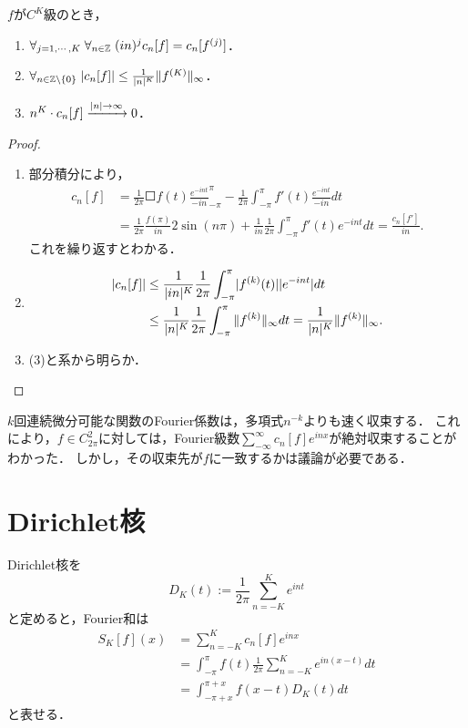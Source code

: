 \documentclass[uplatex,dvipdfmx]{jsreport}
\begin{document}
\begin{corollary}[減衰の精緻化]
    $f$が$C^K$級のとき，
    \begin{enumerate}
        \item $\forall_{j=1,\cdots,K}\;\forall_{n\in\mathbb{Z}}\;(in)^jc_n[f]=c_n[f^{(j)}]$．
        \item $\forall_{n\in\mathbb{Z}\setminus\{0\}}\;\lvert c_n[f]\rvert\le\frac{1}{\lvert n\rvert^K}\|f^{(K)}\|_\infty$．
        \item $n^K\cdot c_n[f]\xrightarrow{\lvert n\rvert\to\infty}0$．
    \end{enumerate}
\end{corollary}
\begin{proof}\mbox{}
    \begin{enumerate}
        \item 部分積分により，
        \begin{align*}
            c_n[f]&=\frac{1}{2\pi}\Square{f(t)\frac{e^{-int}}{-in}}^\pi_{-\pi}-\frac{1}{2\pi}\int^\pi_{-\pi}f'(t)\frac{e^{-int}}{-in}dt\\
            &=\frac{1}{2\pi}\frac{f(\pi)}{in}2\sin(n\pi)+\frac{1}{in}\frac{1}{2\pi}\int^\pi_{-\pi}f'(t)e^{-int}dt=\frac{c_n[f']}{in}.
        \end{align*}
        これを繰り返すとわかる．
        \item \begin{align*}
            \lvert c_n[f]\rvert&\le\frac{1}{\lvert in\rvert^K}\frac{1}{2\pi}\int^\pi_{-\pi}\lvert f^{(k)}(t)\rvert\lvert e^{-int}\rvert dt\\
            &\le\frac{1}{\lvert n\rvert^K}\frac{1}{2\pi}\int^\pi_{-\pi}\|f^{(k)}\|_\infty dt=\frac{1}{\lvert n\rvert^K}\|f^{(k)}\|_\infty.
        \end{align*}
        \item (3)と系から明らか．
    \end{enumerate}
\end{proof}
\begin{remarks}
    $k$回連続微分可能な関数のFourier係数は，多項式$n^{-k}$よりも速く収束する．
    これにより，$f\in C^2_{2\pi}$に対しては，Fourier級数$\sum^\infty_{-\infty}c_n[f]e^{inx}$が絶対収束することがわかった．
    しかし，その収束先が$f$に一致するかは議論が必要である．
\end{remarks}

\section{Dirichlet核}

\begin{definition}
    Dirichlet核を
    \[D_K(t):=\frac{1}{2\pi}\sum^K_{n=-K}e^{int}\]
    と定めると，Fourier和は
    \begin{align*}
        S_K[f](x)&=\sum^K_{n=-K}c_n[f]e^{inx}\\
        &=\int^\pi_{-\pi}f(t)\frac{1}{2\pi}\sum^K_{n=-K}e^{in(x-t)}dt\\
        &=\int^{\pi+x}_{-\pi+x}f(x-t)D_K(t)dt
    \end{align*}
    と表せる．
\end{definition}
\end{document}
